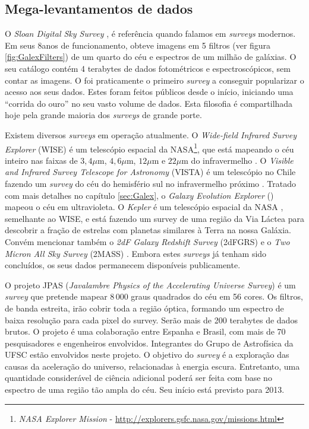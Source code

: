 \subsection{Mega-levantamentos de dados}

O {\em Sloan Digital Sky Survey} \citep[\SDSS]{York2000}, é referência quando
falamos em {\em surveys} modernos. Em seus 8\fixme anos de funcionamento, obteve
imagens em 5 filtros (ver figura \ref{fig:GalexFilters}) de um quarto do céu e
espectros de um milhão de galáxias. O seu catálogo contém 4 terabytes de dados
fotométricos e espectroscópicos, sem contar as imagens. O \SDSS foi praticamente
o primeiro {\em survey} a conseguir popularizar o acesso aos seus dados. Estes
foram feitos públicos desde o início\citneed, iniciando uma ``corrida do ouro''
no seu vasto volume de dados. Esta filosofia é compartilhada hoje pela grande
maioria dos {\em surveys} de grande porte.

Existem diversos {\em surveys} em operação atualmente. O {\em Wide-field
Infrared Survey Explorer} (WISE) é um telescópio espacial da NASA\footnote{{\em
NASA Explorer Mission} - \url{http://explorers.gsfc.nasa.gov/missions.html}},
que está mapeando o céu inteiro nas faixas de $3,4\mu$m, $4,6\mu$m, $12\mu$m e
$22\mu$m do infravermelho \citep{Wright2010}. O {\em Visible and Infrared Survey
Telescope for Astronomy} (VISTA) é um telescópio no Chile fazendo um {\em
survey} do céu do hemisfério sul no infravermelho próximo \citep{Born2010}.
Tratado com mais detalhes no capítulo \ref{sec:Galex}, o {\em Galaxy Evolution
Explorer} (\galex) mapeou o céu em ultravioleta. O {\em Kepler} é um telescópio
espacial da NASA \citep{Borucki2010}, semelhante ao WISE, e está fazendo um
survey de uma região da Via Láctea para descobrir a fração de estrelas com
planetas similares à Terra na nossa Galáxia. Convém mencionar também o {\em 2dF
Galaxy Redshift Survey} (2dFGRS) \citep{Colless1999} e o {\em Two Micron All Sky
Survey} (2MASS) \citep{Skrutskie2006}. Embora estes {\em surveys} já tenham sido
concluídos, os seus dados permanecem disponíveis publicamente.

O projeto JPAS ({\em Javalambre Physics of the Accelerating Universe Survey}) é
um {\em survey} que pretende mapear $8\,000$ graus quadrados do céu em 56
cores\citep{Benitez2009}. Os filtros, de banda estreita, irão cobrir toda a
região óptica, formando um espectro de baixa resolução para cada pixel do
survey. Serão mais de 200 terabytes de dados brutos\citneed. O projeto é uma
colaboração entre Espanha e Brasil, com mais de 70 pesquisadores e engenheiros
envolvidos. Integrantes do Grupo de Astrofísica da UFSC estão envolvidos neste
projeto\citneed. O objetivo do {\em survey} é a exploração das causas da
aceleração do universo, relacionadas à energia escura. Entretanto, uma
quantidade considerável de ciência adicional poderá ser feita com base no
espectro de uma região tão ampla do céu. Seu início está previsto para 2013.

